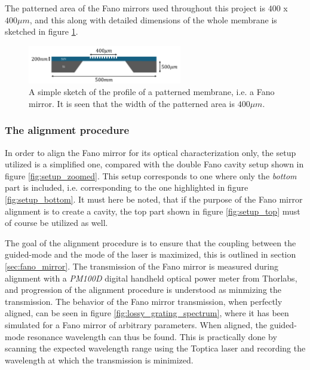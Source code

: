 The patterned area of the Fano mirrors used throughout this project is $400$ x $400 \mu m$, and this along with detailed dimensions of the whole membrane is sketched in figure \ref{fig:grating_sketch}.

\begin{figure}[h!]
    \centering
    \includegraphics[width=0.6\textwidth]{figures/grating_sketch.pdf}
    \caption{A simple sketch of the profile of a patterned membrane, i.e. a Fano mirror. It is seen that the width of the patterned area is $400\mu m$.}
    \label{fig:grating_sketch}
\end{figure}

\subsubsection{The alignment procedure}\label{sec:alignment}

In order to align the Fano mirror for its optical characterization only, the setup utilized is a simplified one, compared with the double Fano cavity setup shown in figure \ref{fig:setup_zoomed}. This setup corresponds to one where only the \emph{bottom} part is included, i.e. corresponding to the one highlighted in figure \ref{fig:setup_bottom}. It must here be noted, that if the purpose of the Fano mirror alignment is to create a cavity, the top part shown in figure \ref{fig:setup_top} must of course be utilized as well. 

The goal of the alignment procedure is to ensure that the coupling between the guided-mode and the mode of the laser is maximized, this is outlined in section \ref{sec:fano_mirror}. The transmission of the Fano mirror is measured during alignment with a \emph{PM100D} digital handheld optical power meter from Thorlabs, and progression of the alignment procedure is understood as minmizing the transmission. The behavior of the Fano mirror transmission, when perfectly aligned, can be seen in figure \ref{fig:lossy_grating_spectrum}, where it has been simulated for a Fano mirror of arbitrary parameters. When aligned, the guided-mode resonance wavelength can thus be found. This is practically done by scanning the expected wavelength range using the Toptica laser and recording the wavelength at which the transmission is minimized.  

